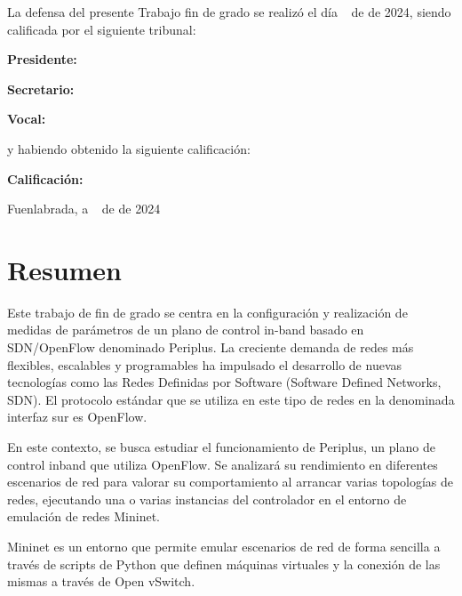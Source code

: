 \documentclass[a4paper, 12pt]{book}
\begin{document}
	\vspace{1cm}
	La defensa del presente Trabajo fin de grado se realizó el día \qquad$\;\,$ de \qquad\qquad\qquad\qquad \newline de 2024, siendo calificada por el siguiente tribunal:
	
	
	\vspace{0.5cm}
	\textbf{Presidente:}
	
	\vspace{1.2cm}
	\textbf{Secretario:}
	
	\vspace{1.2cm}
	\textbf{Vocal:}
	
	
	\vspace{1.2cm}
	y habiendo obtenido la siguiente calificación:
	
	\vspace{1cm}
	\textbf{Calificación:}
	
	
	\vspace{1cm}
	\begin{flushright}
		Fuenlabrada, a \qquad$\;\,$ de \qquad\qquad\qquad\qquad de 2024
	\end{flushright}
	

	
	\chapter*{Resumen}
	Este trabajo de fin de grado se centra en la configuración y realización de medidas de parámetros 
	de un plano de control in-band basado en SDN/OpenFlow denominado Periplus. La
	creciente demanda de redes más flexibles, escalables y programables ha impulsado el desarrollo de 
	nuevas tecnologías como las Redes Definidas por Software (Software Defined Networks, SDN). 
	El protocolo estándar que se utiliza en este tipo de redes en la denominada interfaz sur es
	OpenFlow. 
	
	En este contexto, se busca estudiar el funcionamiento de Periplus, un plano de control  inband que utiliza 
	OpenFlow. Se analizará su rendimiento en diferentes escenarios de red para valorar su comportamiento 
	al arrancar varias topologías de redes, ejecutando una o varias instancias del controlador 
	en el entorno de emulación de redes Mininet.
	
	Mininet es un entorno que permite emular escenarios de red de forma sencilla a través de scripts de 
	Python que definen máquinas virtuales y la conexión de las mismas a través de Open vSwitch.
	
\end{document}
